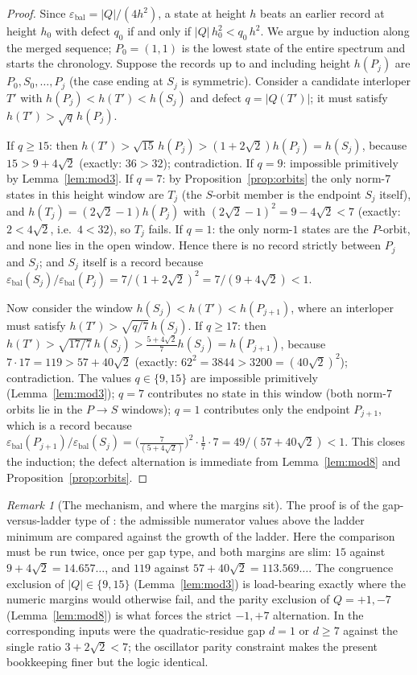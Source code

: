 \documentclass[11pt]{article}
\theoremstyle{definition}
\theoremstyle{remark}
\newtheorem{remark}[theorem]{Remark}
\newcommand{\eb}{\varepsilon_{\mathrm{bal}}}
\begin{document}
\begin{proof}
Since $\eb=|Q|/(4h^2)$, a state at height $h$ beats an earlier record at height $h_0$ with defect $q_0$ if and only if $|Q|\,h_0^2<q_0\,h^2$. We argue by induction along the merged sequence; $P_0=(1,1)$ is the lowest state of the entire spectrum and starts the chronology. Suppose the records up to and including height $h(P_j)$ are $P_0,S_0,\dots,P_j$ (the case ending at $S_j$ is symmetric). Consider a candidate interloper $T'$ with $h(P_j)<h(T')<h(S_j)$ and defect $q=|Q(T')|$; it must satisfy $h(T')>\sqrt q\,h(P_j)$.

If $q\ge15$: then $h(T')>\sqrt{15}\,h(P_j)>(1+2\sqrt2)h(P_j)=h(S_j)$, because $15>9+4\sqrt2$ (exactly: $36>32$); contradiction. If $q=9$: impossible primitively by Lemma~\ref{lem:mod3}. If $q=7$: by Proposition~\ref{prop:orbits} the only norm-$7$ states in this height window are $T_j$ (the $S$-orbit member is the endpoint $S_j$ itself), and $h(T_j)=(2\sqrt2-1)h(P_j)$ with $(2\sqrt2-1)^2=9-4\sqrt2<7$ (exactly: $2<4\sqrt2$, i.e.\ $4<32$), so $T_j$ fails. If $q=1$: the only norm-$1$ states are the $P$-orbit, and none lies in the open window. Hence there is no record strictly between $P_j$ and $S_j$; and $S_j$ itself is a record because $\eb(S_j)/\eb(P_j)=7/(1+2\sqrt2)^2=7/(9+4\sqrt2)<1$.

Now consider the window $h(S_j)<h(T')<h(P_{j+1})$, where an interloper must satisfy $h(T')>\sqrt{q/7}\,h(S_j)$. If $q\ge17$: then $h(T')>\sqrt{17/7}\,h(S_j)>\frac{5+4\sqrt2}{7}h(S_j)=h(P_{j+1})$, because $7\cdot17=119>57+40\sqrt2$ (exactly: $62^2=3844>3200=(40\sqrt2)^2$); contradiction. The values $q\in\{9,15\}$ are impossible primitively (Lemma~\ref{lem:mod3}); $q=7$ contributes no state in this window (both norm-$7$ orbits lie in the $P\!\to\!S$ windows); $q=1$ contributes only the endpoint $P_{j+1}$, which is a record because $\eb(P_{j+1})/\eb(S_j)=\bigl(\tfrac{7}{(5+4\sqrt2)}\bigr)^2\cdot\tfrac{1}{7}\cdot 7=49/(57+40\sqrt2)<1$. This closes the induction; the defect alternation is immediate from Lemma~\ref{lem:mod8} and Proposition~\ref{prop:orbits}.
\end{proof}

\begin{remark}[The mechanism, and where the margins sit]
The proof is of the gap-versus-ladder type of \cite{pellspine,quartercircle}: the admissible numerator values above the ladder minimum are compared against the growth of the ladder. Here the comparison must be run twice, once per gap type, and both margins are slim: $15$ against $9+4\sqrt2=14.657\dots$, and $119$ against $57+40\sqrt2=113.569\dots$. The congruence exclusion of $|Q|\in\{9,15\}$ (Lemma~\ref{lem:mod3}) is load-bearing exactly where the numeric margins would otherwise fail, and the parity exclusion of $Q=+1,-7$ (Lemma~\ref{lem:mod8}) is what forces the strict $-1,+7$ alternation. In \cite{pellspine} the corresponding inputs were the quadratic-residue gap $d=1$ or $d\ge7$ against the single ratio $3+2\sqrt2<7$; the oscillator parity constraint makes the present bookkeeping finer but the logic identical.
\end{remark}
\end{document}
